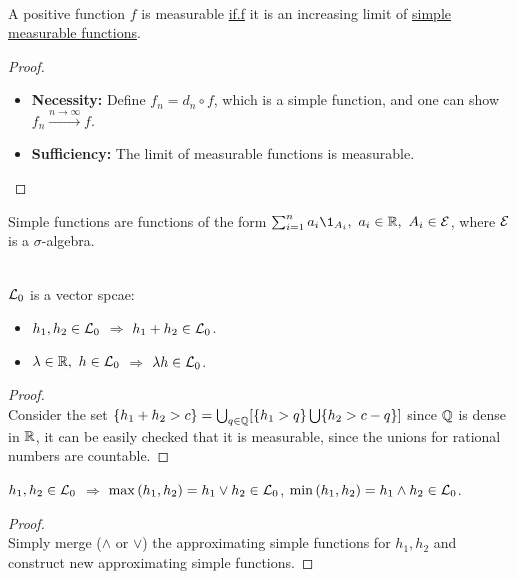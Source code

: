 \begin{theorem}\label{approximation of measurable functions}\ \\
A positive function $f$ is measurable \underline{if.f} it is an increasing limit of \underline{simple measurable functions}.

\end{theorem}
\begin{proof}\ 
\begin{itemize}
    \item \textbf{Necessity:} Define $f_n = d_n \circ f$, which is a simple function, and one can show $f_n \overset{n \to \infty}{\to} f$.
    \item \textbf{Sufficiency:} The limit of measurable functions is measurable.  
\end{itemize}
\end{proof} 
\begin{remark}
Simple functions are functions of the form $\sum_{i=1}^n a_i \1_{A_i},\ a_i \in \R,\ A_i \in \Es$, where $\mathcal{E}$ is a $\sigma$-algebra.
\end{remark}

\vspace{6pt}
\begin{lemma}\ \\
$\mathcal{L}_0$ is a vector spcae:
\begin{itemize}
    \item $h_1,h_2 \in \mathcal{L}_0$ $\Rightarrow$ $h_1 + h_2 \in \mathcal{L}_0$.
    \item $\lambda \in \mathbb{R},\ h \in \mathcal{L}_0$ $\Rightarrow$ $\lambda h \in \mathcal{L}_0$.
\end{itemize}
\end{lemma} 
\begin{proof}\ \\
Consider the set $\{h_1 + h_2 > c\} = \bigcup_{q \in \mathbb{Q}} [\{h_1 > q\} \bigcup \{h_2 > c - q\}]$ since $\mathbb{Q}$ is dense in $\mathbb{R}$, it can be easily checked that it is measurable, since the unions for rational numbers are countable.
\end{proof}

\begin{lemma}
$h_1, h_2 \in \mathcal{L}_0$ $\Rightarrow$ $\max{(h_1, h_2)} = h_1 \vee h_2 \in \mathcal{L}_0$, $\min{(h_1, h_2)} = h_1 \wedge h_2 \in \mathcal{L}_0$.
\end{lemma}
\begin{proof}\ \\
Simply merge ($\wedge$ or $\vee$) the approximating simple functions for $h_1,h_2$ and construct new approximating simple functions. 
\end{proof}
    
